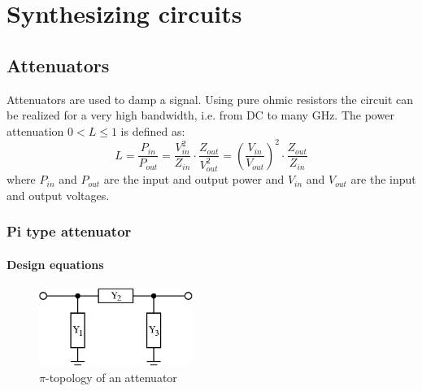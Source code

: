 %
%
%
%
%

\chapter{Synthesizing circuits}
\label{sec:synthesis}

\section{Attenuators}

Attenuators are used to damp a signal. Using pure ohmic resistors
the circuit can be realized for a very high bandwidth, i.e. from
DC to many GHz. The power attenuation $0 < L\le 1$ is defined as:
\begin{equation}
\label{eqn:loss}
L = \dfrac{P_{in}}{P_{out}}
  = \dfrac{V_{in}^2}{Z_{in}}\cdot\dfrac{Z_{out}}{V_{out}^2}
  = \left( \dfrac{V_{in}}{V_{out}}\right)^2 \cdot\dfrac{Z_{out}}{Z_{in}}
\end{equation}
where $P_{in}$ and $P_{out}$ are the input and output power and
$V_{in}$ and $V_{out}$ are the input and output voltages.

\subsection{Pi type attenuator}
\subsubsection{Design equations}

\begin{figure}[ht]
\begin{center}
\includegraphics[width=5cm]{picircuit}
\end{center}
\caption{$\pi$-topology of an attenuator}
\label{fig:pi_attenuator}
\end{figure}
\FloatBarrier

